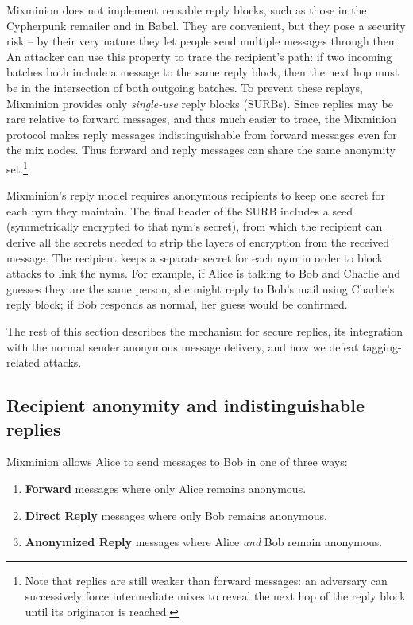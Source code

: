 \documentclass[final]{ieee}
\begin{document}
Mixminion does not implement reusable reply blocks, such as those in
the Cypherpunk 
remailer and in Babel. They are convenient, but they pose a security
risk -- by their very nature they let people send multiple
messages through them.  An attacker can use this property to
trace the recipient's path: if two incoming batches both include a
message to the same reply block, then the next hop must be in the
intersection of both outgoing batches.  To prevent these replays,
Mixminion provides only \emph{single-use} reply blocks (SURBs). Since
replies may be rare relative to forward messages, and thus
much easier to trace, the Mixminion protocol makes reply messages
indistinguishable from forward messages even for the mix nodes. Thus
forward and reply messages can share the same anonymity
set.\footnote{Note that replies are still weaker than forward messages:
an adversary can successively force intermediate mixes to reveal the
next hop of the reply block until its originator is reached.}

Mixminion's reply model requires anonymous recipients to keep one secret
for each nym they maintain. The final header of the SURB includes a seed
(symmetrically encrypted to that nym's secret), from which the recipient
can derive all the secrets needed to strip the layers of encryption from
the received message. The recipient keeps a separate secret for each
nym in order to block attacks to link the nyms. For example, if Alice
is talking to Bob and Charlie and guesses they are the same person, she
might reply to Bob's mail using Charlie's reply block; if Bob responds
as normal, her guess would be confirmed.

The rest of this section describes the mechanism for secure replies,
its integration with the normal sender anonymous message delivery, and
how we defeat tagging-related attacks.  

\subsection{Recipient anonymity and indistinguishable replies}
\label{subsec:replies}
\label{subsec:header-swap}

Mixminion allows Alice to send messages to Bob in one of three ways:

\begin{enumerate}
\item \textbf{Forward} messages where only Alice remains anonymous.
\item \textbf{Direct Reply} messages where only Bob remains anonymous.
\item \textbf{Anonymized Reply} messages where Alice \emph{and} Bob
   remain anonymous.
\end{enumerate}
\end{document}

